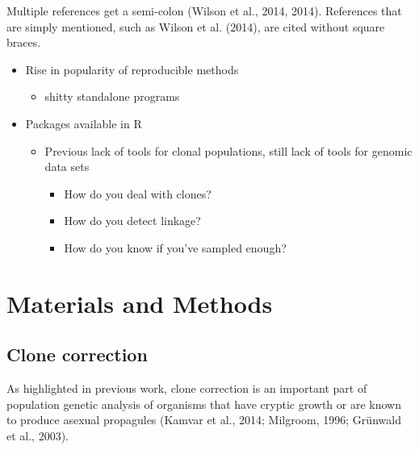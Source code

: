 \documentclass{frontiersSCNS} %
\begin{document}
Multiple references get a semi-colon (Wilson et al., 2014, 2014).
References that are simply mentioned, such as Wilson et al. (2014), are
cited without square braces.

\begin{itemize}
\itemsep1pt\parskip0pt
\item
  Rise in popularity of reproducible methods

  \begin{itemize}
  \itemsep1pt\parskip0pt
  \item
    shitty standalone programs
  \end{itemize}
\item
  Packages available in R

  \begin{itemize}
  \itemsep1pt\parskip0pt
  \item
    Previous lack of tools for clonal populations, still lack of tools
    for genomic data sets

    \begin{itemize}
    \itemsep1pt\parskip0pt
    \item
      How do you deal with clones?
    \item
      How do you detect linkage?
    \item
      How do you know if you've sampled enough?
    \end{itemize}
  \end{itemize}
\end{itemize}

\section*{Materials and Methods}\label{materials-and-methods}

\subsection*{Clone correction}\label{clone-correction}

As highlighted in previous work, clone correction is an important part
of population genetic analysis of organisms that have cryptic growth or
are known to produce asexual propagules (Kamvar et al., 2014; Milgroom,
1996; Grünwald et al., 2003).
\end{document}
